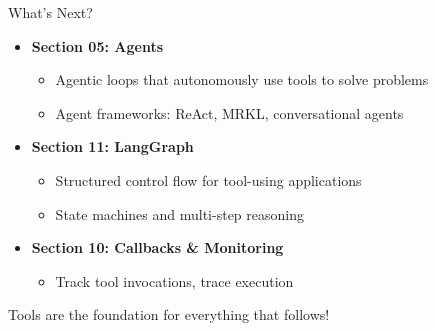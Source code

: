 \documentclass[aspectratio=169,11pt]{beamer}
\begin{document}
\begin{frame}[fragile]{What's Next?}
\begin{itemize}\setlength{\itemsep}{1pt}
  \item \textbf{Section 05: Agents}
    \begin{itemize}\setlength{\itemsep}{1pt}\small
      \item Agentic loops that autonomously use tools to solve problems
      \item Agent frameworks: ReAct, MRKL, conversational agents
    \end{itemize}

  \item \textbf{Section 11: LangGraph}
    \begin{itemize}\setlength{\itemsep}{1pt}\small
      \item Structured control flow for tool-using applications
      \item State machines and multi-step reasoning
    \end{itemize}

  \item \textbf{Section 10: Callbacks \& Monitoring}
    \begin{itemize}\setlength{\itemsep}{1pt}\small
      \item Track tool invocations, trace execution
    \end{itemize}
\end{itemize}

\vfill

Tools are the foundation for everything that follows!
\end{frame}
\end{document}
